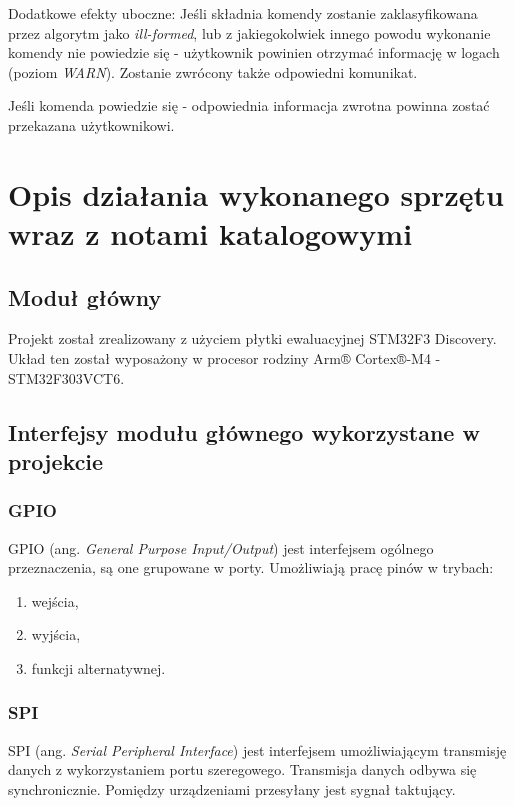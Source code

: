 \documentclass{article}
\begin{document}
Dodatkowe efekty uboczne:
Jeśli składnia komendy zostanie zaklasyfikowana przez algorytm jako \emph{ill-formed},
lub z jakiegokolwiek innego powodu wykonanie komendy nie powiedzie się - użytkownik powinien
otrzymać informację w logach (poziom \emph{WARN}). Zostanie zwrócony także odpowiedni komunikat.

Jeśli komenda powiedzie się - odpowiednia informacja zwrotna powinna zostać przekazana
użytkownikowi.


\section{Opis działania wykonanego sprzętu wraz z notami katalogowymi}

\subsection{Moduł główny}
Projekt został zrealizowany z użyciem płytki ewaluacyjnej STM32F3 Discovery.
Układ ten został wyposażony w procesor rodziny Arm® Cortex®-M4 - STM32F303VCT6.

\subsection{Interfejsy modułu głównego wykorzystane w projekcie}
\subsubsection{GPIO}
GPIO (ang. \emph{General Purpose Input/Output}) jest interfejsem ogólnego przeznaczenia, są one grupowane w porty.
Umożliwiają pracę pinów w trybach:

\begin{enumerate}
   \item wejścia,
   \item wyjścia,
   \item funkcji alternatywnej.
\end{enumerate}

\subsubsection{SPI}
SPI (ang. \emph{Serial Peripheral Interface}) jest interfejsem umożliwiającym transmisję
danych z wykorzystaniem portu szeregowego. Transmisja danych odbywa się synchronicznie.
Pomiędzy urządzeniami przesyłany jest sygnał taktujący.
\end{document}
